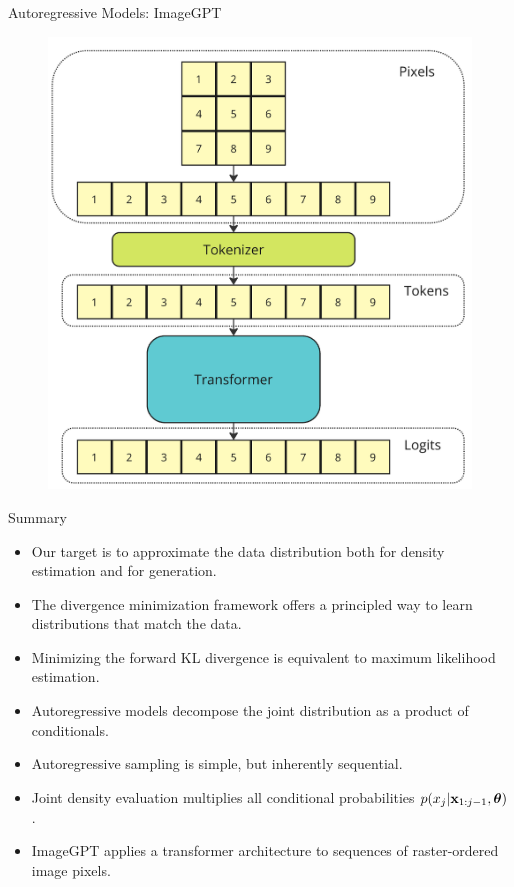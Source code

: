 \documentclass{beamer}
\begin{document}
\begin{frame}{Autoregressive Models: ImageGPT}
	\begin{figure}
		\centering
  			\includegraphics[width=0.65\linewidth]{figs/imagegpt.png}
	\end{figure}
\end{frame}
\begin{frame}{Summary}
    \begin{itemize}
    	\item Our target is to approximate the data distribution both for density estimation and for generation.
    	\vfill
    	\item The divergence minimization framework offers a principled way to learn distributions that match the data.
    	\vfill
    	\item Minimizing the forward KL divergence is equivalent to maximum likelihood estimation.
    	\vfill
    	\item Autoregressive models decompose the joint distribution as a product of conditionals.
    	\vfill
        \item Autoregressive sampling is simple, but inherently sequential.
        \vfill
        \item Joint density evaluation multiplies all conditional probabilities $p(x_j | \mathbf{x}_{1:j - 1}, \boldsymbol{\theta})$.
        \vfill
     	\item ImageGPT applies a transformer architecture to sequences of raster-ordered image pixels.
    \end{itemize}
\end{frame}
\end{document}

